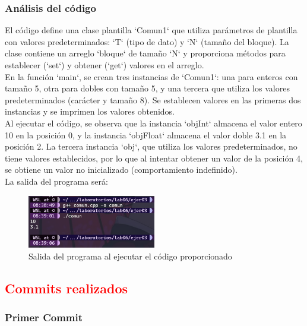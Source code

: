 \subsubsection{Análisis del código}

El código define una clase plantilla `Comun1` que utiliza parámetros de plantilla con valores predeterminados: `T` (tipo de dato) y `N` (tamaño del bloque). La clase contiene un arreglo `bloque` de tamaño `N` y proporciona métodos para establecer (`set`) y obtener (`get`) valores en el arreglo. \\

En la función `main`, se crean tres instancias de `Comun1`: una para enteros con tamaño 5, otra para dobles con tamaño 5, y una tercera que utiliza los valores predeterminados (carácter y tamaño 8). Se establecen valores en las primeras dos instancias y se imprimen los valores obtenidos. \\

Al ejecutar el código, se observa que la instancia `objInt` almacena el valor entero 10 en la posición 0, y la instancia `objFloat` almacena el valor doble 3.1 en la posición 2. La tercera instancia `obj`, que utiliza los valores predeterminados, no tiene valores establecidos, por lo que al intentar obtener un valor de la posición 4, se obtiene un valor no inicializado (comportamiento indefinido). \\

La salida del programa será:

\begin{figure}[H]
    \centering
    \includegraphics[width=0.5\textwidth]{img/Prueba03.png}
    \caption{Salida del programa al ejecutar el código proporcionado}
\end{figure}



\subsection {\textcolor{red}{Commits realizados}}

\subsubsection {Primer Commit}


